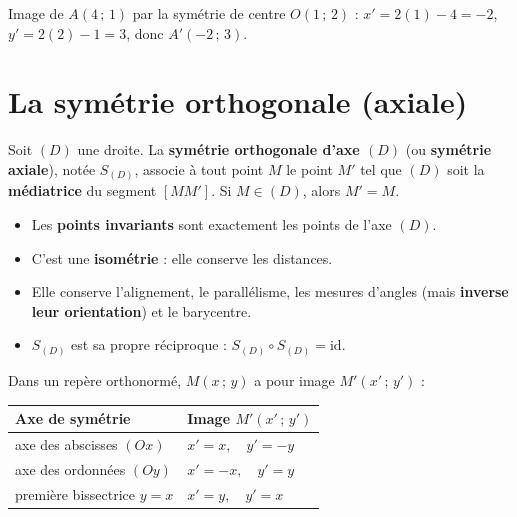 \begin{exemple}
Image de $A(4\,;\,1)$ par la symétrie de centre $O(1\,;\,2)$ :
$x'=2(1)-4=-2$, $y'=2(2)-1=3$, donc $A'(-2\,;\,3)$.
\end{exemple}

\section{La symétrie orthogonale (axiale)}

\begin{definition}
Soit $(D)$ une droite. La \textbf{symétrie orthogonale d'axe $(D)$} (ou
\textbf{symétrie axiale}), notée $S_{(D)}$, associe à tout point $M$ le point $M'$
tel que $(D)$ soit la \textbf{médiatrice} du segment $[MM']$. Si $M\in(D)$, alors
$M'=M$.
\end{definition}

\begin{propriete}
\begin{itemize}
  \item Les \textbf{points invariants} sont exactement les points de l'axe $(D)$.
  \item C'est une \textbf{isométrie} : elle conserve les distances.
  \item Elle conserve l'alignement, le parallélisme, les mesures d'angles
        (mais \textbf{inverse leur orientation}) et le barycentre.
  \item $S_{(D)}$ est sa propre réciproque : $S_{(D)}\circ S_{(D)}=\mathrm{id}$.
\end{itemize}
\end{propriete}

\begin{propriete}
Dans un repère orthonormé, $M(x\,;\,y)$ a pour image $M'(x'\,;\,y')$ :
\begin{center}\renewcommand{\arraystretch}{1.3}
\begin{tabular}{@{}l l@{}}
\toprule
\textbf{Axe de symétrie} & \textbf{Image $M'(x'\,;\,y')$} \\
\midrule
axe des abscisses $(Ox)$ & $x'=x,\quad y'=-y$ \\
axe des ordonnées $(Oy)$ & $x'=-x,\quad y'=y$ \\
première bissectrice $y=x$ & $x'=y,\quad y'=x$ \\
\bottomrule
\end{tabular}
\end{center}
\end{propriete}

